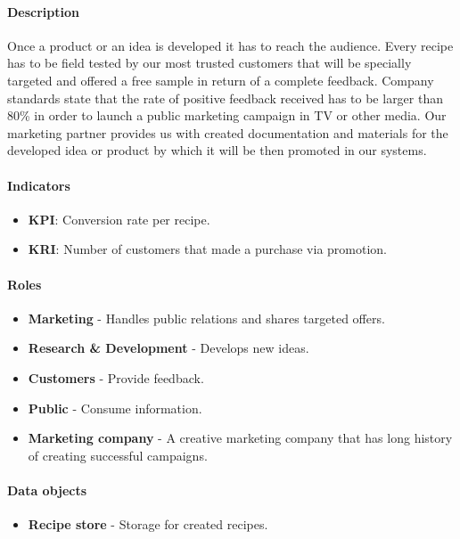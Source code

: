 \documentclass[11pt,a4paper]{article}
\begin{document}
\paragraph{Description}
Once a product or an idea is developed it has to reach the audience. Every recipe has to be field tested by our most trusted customers that will be specially targeted and offered a free sample in return of a complete feedback. Company standards state that the rate of positive feedback received has to be larger than 80\% in order to launch a public marketing campaign in TV or other media. Our marketing partner provides us with created documentation and materials for the developed idea or product by which it will be then promoted in our systems.

\paragraph{Indicators}

\begin{itemize}
    \item \textbf{KPI}: Conversion rate per recipe.
    \item \textbf{KRI}: Number of customers that made a purchase via promotion.
\end{itemize}

\paragraph{Roles}

\begin{itemize}
    \item \textbf{Marketing} - Handles public relations and shares targeted offers.
    \item \textbf{Research \& Development} - Develops new ideas.
    \item \textbf{Customers} - Provide feedback.
    \item \textbf{Public} - Consume information.
    \item \textbf{Marketing company} - A creative marketing company that has long history of creating successful campaigns.
\end{itemize}

\paragraph{Data objects}

\begin{itemize}
    \item \textbf{Recipe store} - Storage for created recipes.
\end{itemize}
\end{document}
